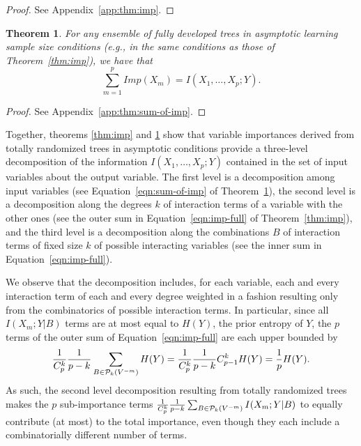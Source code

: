 \documentclass{article}
\newtheorem{theorem}{Theorem}
\begin{document}
\begin{proof}
See Appendix~\ref{app:thm:imp}.
\end{proof}

\begin{theorem}\label{thm:sum-of-imp}
For any ensemble of fully developed trees in asymptotic learning sample size
conditions (e.g., in the same conditions as those of Theorem~\ref{thm:imp}), we
have that
\begin{equation}\label{eqn:sum-of-imp}
\sum_{m=1}^{p}Imp(X_m) = I(X_{1}, \ldots, X_{p} ; Y).
\end{equation}
\end{theorem}

\begin{proof}
See Appendix~\ref{app:thm:sum-of-imp}.
\end{proof}

Together, theorems \ref{thm:imp} and \ref{thm:sum-of-imp} show that  variable
importances derived from totally randomized trees in asymptotic conditions
provide a three-level decomposition of the information $I(X_{1}, \ldots, X_{p}
; Y)$ contained in the set of input variables about the output variable. The
first level is a decomposition among input variables (see Equation~\ref{eqn:sum-of-imp}
of Theorem~\ref{thm:sum-of-imp}),  the second level is a decomposition
along the degrees $k$ of interaction terms of a variable with the other ones
(see the outer sum in Equation~\ref{eqn:imp-full} of Theorem~\ref{thm:imp}), and
the third level is a decomposition along the combinations $B$ of interaction
terms of fixed size $k$ of possible interacting variables (see the inner sum in Equation~\ref{eqn:imp-full}).

We observe that the decomposition includes, for each variable, each and every interaction term
of each and every degree weighted in a fashion resulting only from the
combinatorics of possible interaction terms. In particular, since all
$I(X_m;Y|B)$ terms are at most equal to $H(Y)$, the prior entropy of $Y$,  the
$p$ terms of the outer sum of Equation~\ref{eqn:imp-full} are each upper bounded
by $$\frac{1}{C^k_p}\frac{1}{p-k}\sum_{B \in {\cal P}_k(V^{-m})}
H(Y)=\frac{1}{C^k_p} \frac{1}{p-k} {C^k_{p-1}} H(Y) = \frac{1}{p}H(Y).$$ As such,
the second level decomposition resulting from totally randomized trees makes the
$p$ sub-importance terms $\frac{1}{C^k_p} \frac{1}{p-k} \sum_{B \in {\cal
P}_k(V^{-m})} I(X_m;Y|B)$ to equally contribute (at most) to the total
importance, even though they each include a combinatorially different number of
terms.
\end{document}
